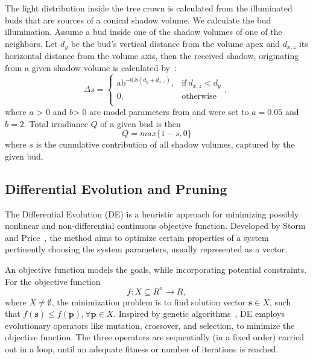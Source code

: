 The light distribution
inside the tree crown is calculated from the illuminated buds that are
sources of a conical shadow volume. We calculate the bud illumination.
Assume a bud inside one of the shadow volumes of one of the
neighbors. Let \(d_{y}\) be the bud's vertical distance from the volume
apex and \(d_{x,z}\) its horizontal distance from the volume axis, then
the received shadow, originating from a given shadow volume is
calculated by~\cite{strnad_novel_2017}:
\begin{equation}
\Delta s = \left\{ \begin{matrix}
\text{ab}^{- 0.8\left( d_{y} + d_{x,z} \right)}, & \mathrm{\text{if}}\ d_{x,z} < d_{y} \\
0, & \mathrm{otherwise} \\
\end{matrix}, \right.\    
\end{equation}
where \(a\) \textgreater{} 0 and \(b\)\textgreater{} 0 are model
parameters from \cite{palubicki_self-organizing_2009} and were set to \(a = 0.05\) and \(b = 2\).
Total irradiance $Q$ of a given bud is then
\begin{equation}
  Q = max\{1 - s, 0\}\label{eqn:q}  
\end{equation}
where \(s\) is the cumulative contribution of all shadow volumes,
captured by the given bud.

\subsection{Differential Evolution and Pruning}
The Differential Evolution (DE) is a heuristic approach for minimizing possibly nonlinear and non-differential continuous objective function. Developed by Storm and Price~\cite{storn_differential_1997}, the method aims to optimize certain properties of a system pertinently choosing the system parameters, usually represented as a vector. 

An objective function models the goals, while incorporating potential constraints. For the objective function 
\begin{equation}
f:X \subseteq\!R^{n}\rightarrow \!R,
\end{equation}
where $X\neq\emptyset$, the minimization problem is to find solution vector $\mathbf{s}\in X$, such that $f(\mathbf{s})\leq f(\mathbf{p}), \forall \mathbf{p}\in X$. 
Inspired by genetic algorithms~\cite{davis1991handbook}, DE employs evolutionary operators like mutation, crossover, and selection, to minimize the objective function. The three operators are sequentially (in a fixed order) carried out in a loop, until an adequate fitness or number of iterations is reached.

